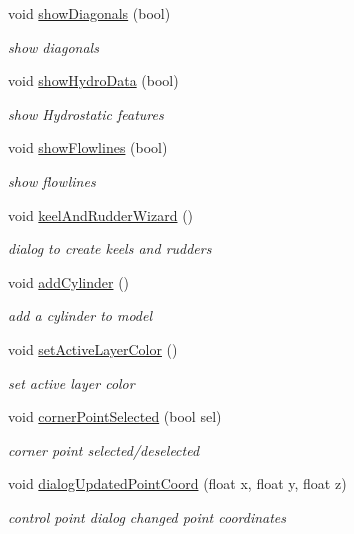 \begin{DoxyCompactItemize}
void \hyperlink{classShipCAD_1_1Controller_aa6729abfadacef4f98c6dbe7d4c1a7e6}{show\-Diagonals} (bool)
\begin{DoxyCompactList}\small\item\em show diagonals \end{DoxyCompactList}\item 
void \hyperlink{classShipCAD_1_1Controller_a29d2c68605ec90055ae0aa27761f2b08}{show\-Hydro\-Data} (bool)
\begin{DoxyCompactList}\small\item\em show Hydrostatic features \end{DoxyCompactList}\item 
void \hyperlink{classShipCAD_1_1Controller_a74187705f2260e641293b2f369757f98}{show\-Flowlines} (bool)
\begin{DoxyCompactList}\small\item\em show flowlines \end{DoxyCompactList}\item 
void \hyperlink{classShipCAD_1_1Controller_acaba200143a2ae5e7ea8d423633bcdf5}{keel\-And\-Rudder\-Wizard} ()
\begin{DoxyCompactList}\small\item\em dialog to create keels and rudders \end{DoxyCompactList}\item 
void \hyperlink{classShipCAD_1_1Controller_a8d257c1c04ae4e6780e91ad53ba767d8}{add\-Cylinder} ()
\begin{DoxyCompactList}\small\item\em add a cylinder to model \end{DoxyCompactList}\item 
void \hyperlink{classShipCAD_1_1Controller_aa471985ce00a517249c2b476db9d4ac6}{set\-Active\-Layer\-Color} ()
\begin{DoxyCompactList}\small\item\em set active layer color \end{DoxyCompactList}\item 
void \hyperlink{classShipCAD_1_1Controller_a5b83cea66e4de67cd7fd11df307b948d}{corner\-Point\-Selected} (bool sel)
\begin{DoxyCompactList}\small\item\em corner point selected/deselected \end{DoxyCompactList}\item 
void \hyperlink{classShipCAD_1_1Controller_a36de0343e95626e62e9683bcfc47a1ee}{dialog\-Updated\-Point\-Coord} (float x, float y, float z)
\begin{DoxyCompactList}\small\item\em control point dialog changed point coordinates \end{DoxyCompactList}\end{DoxyCompactItemize}

